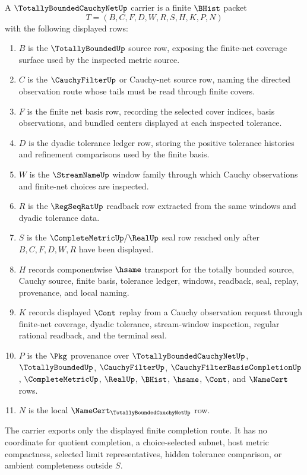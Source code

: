 \begin{definition}
\label{def:totally-bounded-cauchy-net-carrier}
A $\TotallyBoundedCauchyNetUp$ carrier is a finite $\BHist$ packet
$$
T=(B,C,F,D,W,R,S,H,K,P,N)
$$
with the following displayed rows:
\begin{enumerate}
\item $B$ is the $\TotallyBoundedUp$ source row, exposing the finite-net coverage surface used by the inspected metric source.
\item $C$ is the $\CauchyFilterUp$ or Cauchy-net source row, naming the directed observation route whose tails must be read through finite covers.
\item $F$ is the finite net basis row, recording the selected cover indices, basis observations, and bundled centers displayed at each inspected tolerance.
\item $D$ is the dyadic tolerance ledger row, storing the positive tolerance histories and refinement comparisons used by the finite basis.
\item $W$ is the $\StreamNameUp$ window family through which Cauchy observations and finite-net choices are inspected.
\item $R$ is the $\RegSeqRatUp$ readback row extracted from the same windows and dyadic tolerance data.
\item $S$ is the $\CompleteMetricUp/\RealUp$ seal row reached only after $B,C,F,D,W,R$ have been displayed.
\item $H$ records componentwise $\hsame$ transport for the totally bounded source, Cauchy source, finite basis, tolerance ledger, windows, readback, seal, replay, provenance, and local naming.
\item $K$ records displayed $\Cont$ replay from a Cauchy observation request through finite-net coverage, dyadic tolerance, stream-window inspection, regular rational readback, and the terminal seal.
\item $P$ is the $\Pkg$ provenance over $\TotallyBoundedCauchyNetUp$, $\TotallyBoundedUp$, $\CauchyFilterUp$, $\CauchyFilterBasisCompletionUp$, $\CompleteMetricUp$, $\RealUp$, $\BHist$, $\hsame$, $\Cont$, and $\NameCert$ rows.
\item $N$ is the local $\NameCert_{\TotallyBoundedCauchyNetUp}$ row.
\end{enumerate}
The carrier exports only the displayed finite completion route. It has no coordinate for quotient completion, a choice-selected subnet, host metric compactness, selected limit representatives, hidden tolerance comparison, or ambient completeness outside $S$.
\end{definition}

